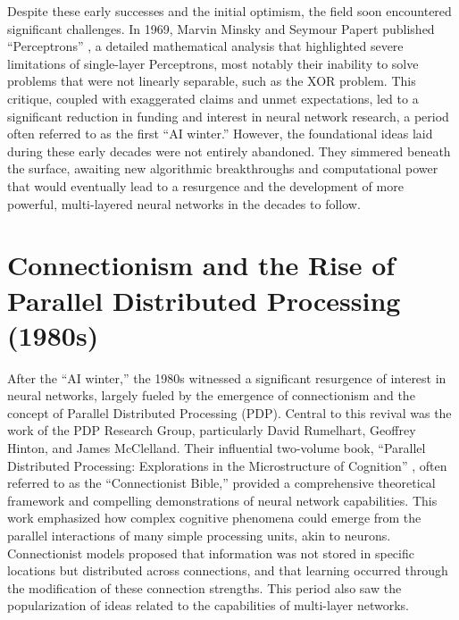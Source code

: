 \documentclass[11pt,a4paper]{article}
\begin{document}
Despite these early successes and the initial optimism, the field soon encountered significant challenges. In 1969, Marvin Minsky and Seymour Papert published ``Perceptrons'' \cite{minsky1969perceptrons}, a detailed mathematical analysis that highlighted severe limitations of single-layer Perceptrons, most notably their inability to solve problems that were not linearly separable, such as the XOR problem. This critique, coupled with exaggerated claims and unmet expectations, led to a significant reduction in funding and interest in neural network research, a period often referred to as the first ``AI winter.'' However, the foundational ideas laid during these early decades were not entirely abandoned. They simmered beneath the surface, awaiting new algorithmic breakthroughs and computational power that would eventually lead to a resurgence and the development of more powerful, multi-layered neural networks in the decades to follow.

\section{Connectionism and the Rise of Parallel Distributed Processing (1980s)}

After the ``AI winter,'' the 1980s witnessed a significant resurgence of interest in neural networks, largely fueled by the emergence of connectionism and the concept of Parallel Distributed Processing (PDP). Central to this revival was the work of the PDP Research Group, particularly David Rumelhart, Geoffrey Hinton, and James McClelland. Their influential two-volume book, ``Parallel Distributed Processing: Explorations in the Microstructure of Cognition'' \cite{mcclelland1986parallel}, often referred to as the ``Connectionist Bible,'' provided a comprehensive theoretical framework and compelling demonstrations of neural network capabilities. This work emphasized how complex cognitive phenomena could emerge from the parallel interactions of many simple processing units, akin to neurons. Connectionist models proposed that information was not stored in specific locations but distributed across connections, and that learning occurred through the modification of these connection strengths. This period also saw the popularization of ideas related to the capabilities of multi-layer networks.
\end{document}
